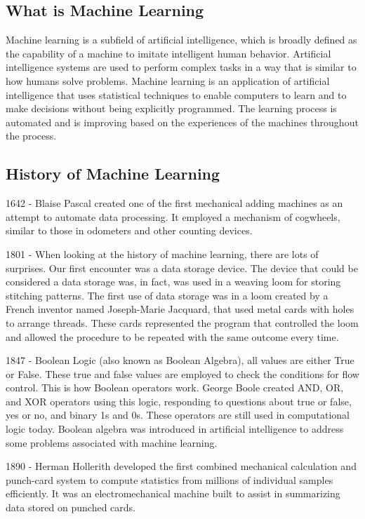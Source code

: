 \documentclass[english,12pt,oneside,a4paper]{article}
\begin{document}
		\subsection{What is Machine Learning}
		Machine learning is a subfield of artificial intelligence, which is broadly defined as the capability of a machine to imitate intelligent human behavior. Artificial intelligence systems are used to perform complex tasks in a way that is similar to how humans solve problems.
		Machine learning is an application of artificial intelligence that uses statistical techniques to enable computers to learn and to make decisions without being explicitly programmed. The learning process is automated and is improving based on the experiences of the machines throughout the process.
		\subsection{History of Machine Learning}
		1642 - Blaise Pascal created one of the first mechanical adding machines as an attempt to automate data processing. It employed a mechanism of cogwheels, similar to those in odometers and other counting devices.
		
		1801 - When looking at the history of machine learning, there are lots of surprises. Our first encounter was a data storage device. The device that could be considered a data storage was, in fact, was used in a weaving loom for storing stitching patterns. The first use of data storage was in a loom created by a French inventor named Joseph-Marie Jacquard, that used metal cards with holes to arrange threads. These cards represented the program that controlled the loom and allowed the procedure to be repeated with the same outcome every time.
		
		1847 - Boolean Logic (also known as Boolean Algebra), all values are either True or False. These true and false values are employed to check the conditions for flow control. This is how Boolean operators work. George Boole created AND, OR, and XOR operators using this logic, responding to questions about true or false, yes or no, and binary 1s and 0s. These operators are still used in computational logic today.
		Boolean algebra was introduced in artificial intelligence to address some problems associated with machine learning.
		
		1890 - Herman Hollerith developed the first combined mechanical calculation and punch-card system to compute statistics from millions of individual samples efficiently. It was an electromechanical machine built to assist in summarizing data stored on punched cards.
		
\end{document}
